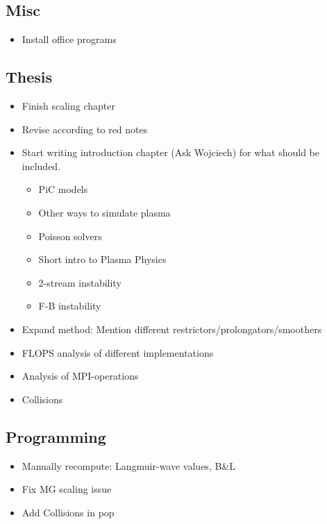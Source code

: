 \subsection{Misc}
    \begin{itemize}
        \item Install office programs
    \end{itemize}

\subsection{Thesis}
\begin{itemize}
  \item Finish scaling chapter
  \item Revise according to red notes
  \item Start writing introduction chapter (Ask Wojciech) for what should be included.
    \begin{itemize}
      \item PiC models
      \item Other ways to simulate plasma
      \item Poisson solvers
      \item Short intro to Plasma Physics
      \item 2-stream instability
      \item F-B instability
    \end{itemize}
  \item Expand method: Mention different restrictors/prolongators/smoothers
  \item FLOPS analysis of different implementations
  \item Analysis of MPI-operations
  \item Collisions
\end{itemize}

\subsection{Programming}
\begin{itemize}
  \item Manually recompute: Langmuir-wave values, B&L
  \item Fix MG scaling issue
  \item Add Collisions in pop
\end{itemize}
